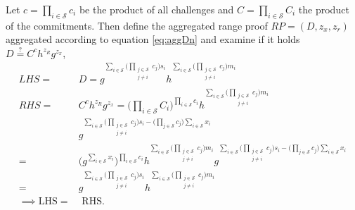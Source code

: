 Let $c=\prod_{i\in\mathcal{S}} c_i$ be the product of all challenges and $C= \prod_{i\in\mathcal{S}} C_i$ the product of the commitments.  Then define the aggregated range proof $RP = (D,z_x,z_r)$ aggregated according to equation \ref{eq:aggDn} and examine if it holds $D\overset{?}{=} C^ch^{z_R}g^{z_x}$, 
\begin{align*}
LHS =& D = g ^ {\sum_{i\in\mathcal{S}} \Big(\prod_{\substack{j\in\mathcal{S}\\ j\neq i}}   c_j \Big)s_i} h^ {\sum_{i\in\mathcal{S}} \Big(\prod_{\substack{j\in\mathcal{S}\\ j\neq i}}    c_j \Big)m_i}  \\
RHS =& C^ch^{z_R}g^{z_x} =  \Big( \prod_{i\in\mathcal{S}} C_i \Big)^{\prod_{i\in\mathcal{S}} c_i}h^ {\sum_{i\in\mathcal{S}} \Big( \prod_{\substack{j\in\mathcal{S}\\ j\neq i}}   c_j \Big)m_i}\\
&g^{ \sum_{i\in\mathcal{S}} \Big( \prod_{\substack{j\in\mathcal{S}\\ j\neq i}}   c_j \Big)s_i - \big( \prod_{j\in\mathcal{S}} c_j \Big) \sum_{i\in\mathcal{S}} x_i}\\ 
 =& \Big( g^{\sum_{i\in\mathcal{S}} x_i} \Big)^{\prod_{i\in\mathcal{S}} c_i}h^{\sum_{i\in\mathcal{S}} \Big( \prod_{\substack{j\in\mathcal{S}\\ j\neq i}}   c_j \Big)m_i} g^{ \sum_{i\in\mathcal{S}} \Big( \prod_{\substack{j\in\mathcal{S}\\ j\neq i}}   c_j \Big)s_i - \big( \prod_{j\in\mathcal{S}} c_j \Big) \sum_{i\in\mathcal{S}} x_i} \\
 =&  g^{ \sum_{i\in\mathcal{S}} \Big( \prod_{\substack{j\in\mathcal{S}\\ j\neq i}}  c_j \Big)s_i } h^{\sum_{i\in\mathcal{S}} \Big( \prod_{\substack{j\in\mathcal{S}\\ j\neq i}}   c_j \Big)m_i}  
\\ \implies \text{LHS} =& \text{ RHS}.
\end{align*}




